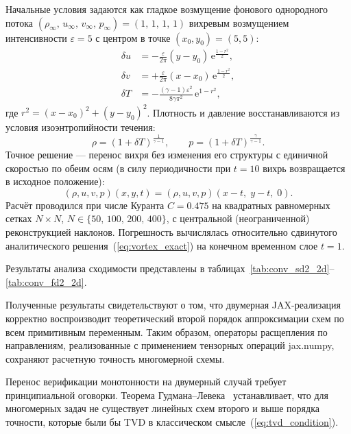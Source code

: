 \documentclass[a4paper,14pt]{extarticle}
\newcommand{\euler}{\mathrm{e}}
\theoremstyle{theorem}
\theoremstyle{lemma}
\begin{document}
Начальные условия задаются как гладкое возмущение фонового однородного потока $(\rho_\infty,\, u_\infty,\, v_\infty,\, p_\infty) = (1,\, 1,\, 1,\, 1)$ вихревым возмущением интенсивности $\varepsilon = 5$ с центром в точке $(x_0, y_0) = (5, 5)$:
\begin{equation}
    \label{eq:vortex_delta}
    \begin{aligned}
        \delta u &= -\frac{\varepsilon}{2\pi}(y - y_0)\,\euler^{\frac{1-r^2}{2}}, \\
        \delta v &= +\frac{\varepsilon}{2\pi}(x - x_0)\,\euler^{\frac{1-r^2}{2}}, \\
        \delta T &= -\frac{(\gamma-1)\varepsilon^2}{8\gamma\pi^2}\,\euler^{1-r^2},
    \end{aligned}
\end{equation}
где $r^2 = (x - x_0)^2 + (y - y_0)^2$. Плотность и давление восстанавливаются из условия изоэнтропийности течения:
\begin{equation}
    \label{eq:vortex_rho_p}
    \rho = (1 + \delta T)^{\frac{1}{\gamma-1}}, \qquad p = (1 + \delta T)^{\frac{\gamma}{\gamma-1}}.
\end{equation}
Точное решение --- перенос вихря без изменения его структуры с единичной скоростью по обеим осям (в силу периодичности при $t = 10$ вихрь возвращается в исходное положение):
\begin{equation}
    \label{eq:vortex_exact}
    (\rho, u, v, p)(x, y, t) = (\rho, u, v, p)(x - t,\; y - t,\; 0).
\end{equation}
Расчёт проводился при числе Куранта $C = 0.475$ на квадратных равномерных сетках $N \times N$, $N \in \{50,\, 100,\, 200,\, 400\}$, с центральной (неограниченной) реконструкцией наклонов. Погрешность вычислялась относительно сдвинутого аналитического решения~(\ref{eq:vortex_exact}) на конечном временном слое $t = 1$.

Результаты анализа сходимости представлены в таблицах~\ref{tab:conv_sd2_2d}--\ref{tab:conv_fd2_2d}.

Полученные результаты свидетельствуют о том, что двумерная JAX-реализация
корректно воспроизводит теоретический второй порядок аппроксимации схем по всем
примитивным переменным.
Таким образом, операторы расщепления по направлениям, реализованные с
применением тензорных операций jax.numpy, сохраняют расчетную
точность многомерной схемы.

Перенос верификации монотонности на двумерный случай требует принципиальной
оговорки. Теорема Гудмана--Левека~\cite{goodman1985} устанавливает, что
для многомерных задач не существует линейных схем второго и выше порядка
точности, которые были бы TVD в классическом смысле~(\ref{eq:tvd_condition}).
\end{document}
